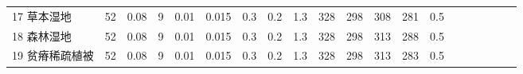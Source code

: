 \begin{sidewaystable}[]
\begin{tabular}{@{}lccccccccccccccccccc@{}}
    17 草本湿地    & 52                                                                & 0.08                                                                                                   & 9                                                                                  & 0.01                                                                               & 0.015                                                               & 0.3                                                       & 0.2                                                       & 1.3                                                       & 328                                                             & 298                                                             & 308                                                              & 281                                                               & 0.5                                                          \\
    18 森林湿地    & 52                                                                & 0.08                                                                                                   & 9                                                                                  & 0.01                                                                               & 0.015                                                               & 0.3                                                       & 0.2                                                       & 1.3                                                       & 328                                                             & 298                                                             & 313                                                              & 288                                                               & 0.5                                                          \\
    19 贫瘠稀疏植被  & 52                                                                & 0.08                                                                                                   & 9                                                                                  & 0.01                                                                               & 0.015                                                               & 0.3                                                       & 0.2                                                       & 1.3                                                       & 328                                                             & 298                                                             & 313                                                              & 283                                                               & 0.5                                                          \\

\end{tabular}
\end{sidewaystable}

